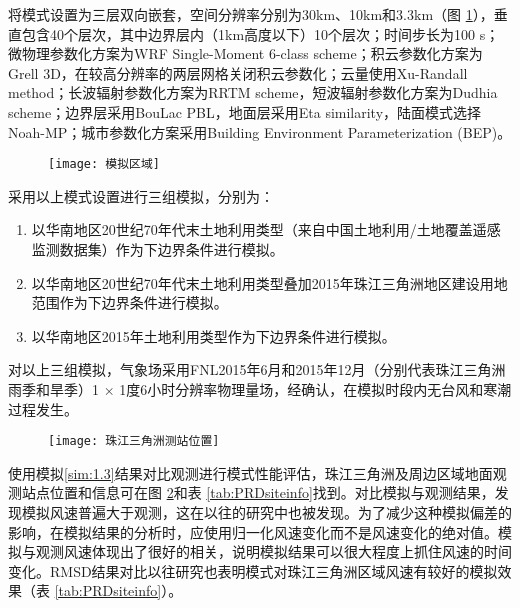 将模式设置为三层双向嵌套，空间分辨率分别为30km、10km和3.3km（图 \ref{fig:PRDmodeldomain}），垂直包含40个层次，其中边界层内（1km高度以下）10个层次；时间步长为100 s；微物理参数化方案为WRF Single-Moment 6-class scheme；积云参数化方案为Grell 3D，在较高分辨率的两层网格关闭积云参数化；云量使用Xu-Randall method；长波辐射参数化方案为RRTM scheme，短波辐射参数化方案为Dudhia scheme；边界层采用BouLac PBL，地面层采用Eta similarity，陆面模式选择Noah-MP；城市参数化方案采用Building Environment Parameterization (BEP)。

\begin{figure}[!htbp]
    \centering
    \texttt{[image: 模拟区域]}
    \label{fig:PRDmodeldomain}
\end{figure}

采用以上模式设置进行三组模拟，分别为：

\begin{enumerate}

\item \label{sim:1.1} 以华南地区20世纪70年代末土地利用类型（来自中国土地利用/土地覆盖遥感监测数据集）作为下边界条件进行模拟。

\item \label{sim:1.2} 以华南地区20世纪70年代末土地利用类型叠加2015年珠江三角洲地区建设用地范围作为下边界条件进行模拟。
	
\item \label{sim:1.3} 以华南地区2015年土地利用类型作为下边界条件进行模拟。

\end{enumerate}

对以上三组模拟，气象场采用FNL2015年6月和2015年12月（分别代表珠江三角洲雨季和旱季）1 $\times$ 1度6小时分辨率物理量场，经确认，在模拟时段内无台风和寒潮过程发生。

\begin{figure}[!htbp]
    \centering
    \texttt{[image: 珠江三角洲测站位置]}
    \label{fig:PRDobssites}
\end{figure}

使用模拟\ref{sim:1.3}结果对比观测进行模式性能评估，珠江三角洲及周边区域地面观测站点位置和信息可在图 \ref{fig:PRDobssites}和表 \ref{tab:PRDsiteinfo}找到。对比模拟与观测结果，发现模拟风速普遍大于观测，这在以往的研究中也被发现\citep{zhang2010modeling, yu2015evaluation, zha2019numerical}。为了减少这种模拟偏差的影响，在模拟结果的分析时，应使用归一化风速变化而不是风速变化的绝对值。模拟与观测风速体现出了很好的相关，说明模拟结果可以很大程度上抓住风速的时间变化。RMSD结果对比以往研究\citep{zhang2010modeling, zha2019numerical}也表明模式对珠江三角洲区域风速有较好的模拟效果（表 \ref{tab:PRDsiteinfo}）。

